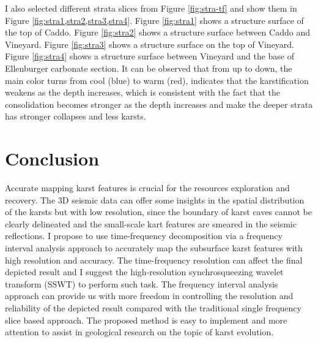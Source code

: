 I also selected different strata slices from Figure \ref{fig:stra-tf} and show them in Figure \ref{fig:stra1,stra2,stra3,stra4}. Figure \ref{fig:stra1} shows a structure surface of the top of Caddo. Figure \ref{fig:stra2} shows a structure surface between Caddo and Vineyard. Figure \ref{fig:stra3} shows a structure surface on the top of Vineyard. Figure \ref{fig:stra4} shows a structure surface between Vineyard and the base of Ellenburger carbonate section. It can be observed that from up to down, the main color turns from cool (blue) to warm (red), indicates that the karstification weakens as the depth increases, which is consistent with the fact that the consolidation becomes stronger as the depth increases and make the deeper strata has stronger collapses and less karsts.  
 
 
\section{Conclusion}
Accurate mapping  karst features is crucial for the resources exploration and recovery. The 3D seismic data can offer some insights in the spatial distribution of the karsts\new{,} but with low resolution, since the boundary of karst caves cannot be clearly delineated and the small-scale kart features are smeared in the seismic reflections. I propose to use time-frequency decomposition via a frequency interval analysis approach to accurately map the subsurface karst features with high resolution and accuracy. The time-frequency resolution can affect the final depicted result\new{,} and I suggest  the high-resolution synchrosqueezing wavelet transform (SSWT) to perform such task. The frequency interval analysis approach can provide us with more freedom in controlling the resolution and reliability of the  depicted result\new{,} compared with the traditional single frequency slice based approach. The proposed method is easy to implement and  more attention to assist in geological research on the topic of karst evolution.


